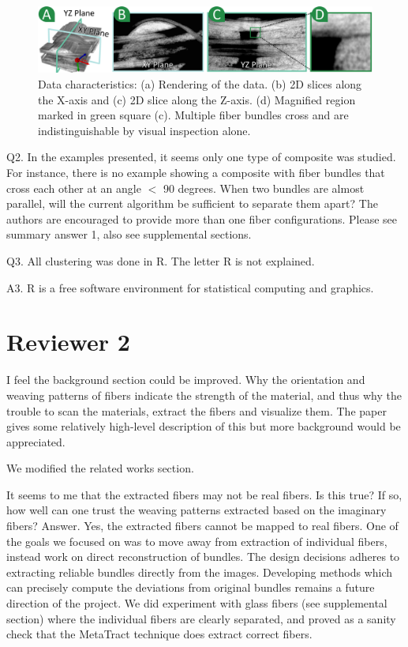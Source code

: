 \documentclass[]{article}
\begin{document}
\begin{figure}[tb]
	\centering
	\includegraphics[width=\linewidth]{images_pvis/data-char.pdf}
	\caption{Data characteristics: (a) Rendering of the data. (b) 2D slices along the X-axis and (c) 2D slice along the Z-axis. (d) Magnified region marked in green square (c). Multiple fiber bundles cross and are indistinguishable by visual inspection alone. }
	\label{fig:data-char-rebuttal}
\end{figure}

\color{red}
Q2. In the examples presented, it seems only one type of composite was studied. For instance, there is no example showing a composite with fiber bundles that cross each other at an angle $<$ 90 degrees. When two bundles are almost parallel, will the current algorithm be sufficient to separate them apart? The authors are encouraged to provide more than one fiber configurations.
\color{black}
Please see summary answer 1, also see supplemental sections.  

  

\color{red}
Q3. All clustering was done in R. The letter R is not explained.
\color{black}

A3. R is a free software environment for statistical computing and graphics.

\section{Reviewer 2}
\color{red}
I feel the background section could be improved. Why the orientation and weaving patterns of fibers indicate the strength of the material, and thus why the trouble to scan the materials, extract the fibers and visualize them. The paper gives some relatively high-level description of this but more background would be appreciated.


\color{black}
We modified the related works section.

\color{red}
  It seems to me that the extracted fibers may not be real fibers. Is this
  true? If so, how well can one trust the weaving patterns extracted based
  on the imaginary fibers? 
  \color{black}
  Answer. 
Yes, the extracted fibers cannot be mapped to real fibers. One of the goals  we  focused on was to move away from extraction of individual fibers, instead work on direct reconstruction of bundles. The design decisions adheres to extracting reliable bundles directly from the images. 
 Developing methods which can precisely compute the deviations from original bundles remains a future direction of the project. We did experiment with glass fibers (see supplemental section) where the individual fibers are clearly separated, and proved as a sanity check that the MetaTract technique does extract correct fibers. 
\end{document}
